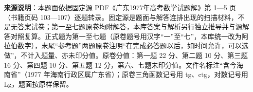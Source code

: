 


\begin{gktip}
\textbf{来源说明}：本题面依据固定源 PDF《广东1977年高考数学试题解》第 1—5 页（书籍页码 103—107）逐题转录。固定源是题面与解答连排出现的扫描材料，不是无答案试卷；第一至七题原卷均附解答，本库答案与解析另行独立推导并与源解答对照复算。正式题为第一至七题（原卷题号用汉字“一”至“七”，本库统一改为阿拉伯数字），末尾“参考题”两题原卷注明“在完成必答题以后，如时间允许，可以选做”，不计入题量、亦未印分值。原卷分值：第一题 22 分、第二题 10 分、第三题 16 分、第四题 10 分、第五题 12 分，第六、七题未印分值。文件名标注“含今海南省”（1977 年海南行政区属广东省）；原卷三角函数记号用 tg、ctg，对数记号用 Lg，题面按原样保留。
\end{gktip}

\par\medskip

